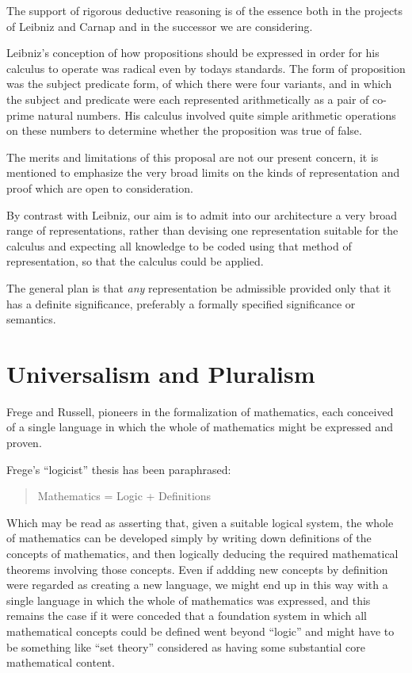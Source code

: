 The support of rigorous deductive reasoning is of the essence both in
the projects of Leibniz and Carnap and in the successor we are
considering.

Leibniz's conception of how propositions should be expressed in order
for his calculus to operate was radical even by todays standards.
The form of proposition was the subject predicate form, of which there
were four variants, and in which the subject and predicate were each
represented arithmetically as a pair of co-prime natural numbers.
His calculus involved quite simple arithmetic operations on these
numbers to determine whether the proposition was true of false.

The merits and limitations of this proposal are not our present
concern, it is mentioned to emphasize the very broad limits on
the kinds of representation and proof which are open to
consideration.

By contrast with Leibniz, our aim is to admit into our architecture a
very broad range of representations, rather than devising one
representation suitable for the calculus and expecting all knowledge
to be coded using that method of representation, so that the calculus
could be applied.

The general plan is that \emph{any} representation be admissible
provided only that it has a definite significance, preferably a
formally specified significance or semantics.

\section{Universalism and Pluralism}

Frege and Russell, pioneers in the formalization of mathematics, each
conceived of a single language in which the whole of mathematics might
be expressed and proven.

Frege's ``logicist'' thesis has been paraphrased:

\begin{quote}
Mathematics = Logic + Definitions
\end{quote}

Which may be read as asserting that, given a suitable logical system,
the whole of mathematics can be developed simply by writing down
definitions of the concepts of mathematics, and then logically deducing
the required mathematical theorems involving those concepts.
Even if addding new concepts by definition were regarded as creating
a new language, we might end up in this way with a single language in
which the whole of mathematics was expressed, and this remains the case
if it were conceded that a foundation system in which all mathematical
concepts could be defined went beyond ``logic'' and might have to be
something like ``set theory'' considered as having some substantial
core mathematical content.


